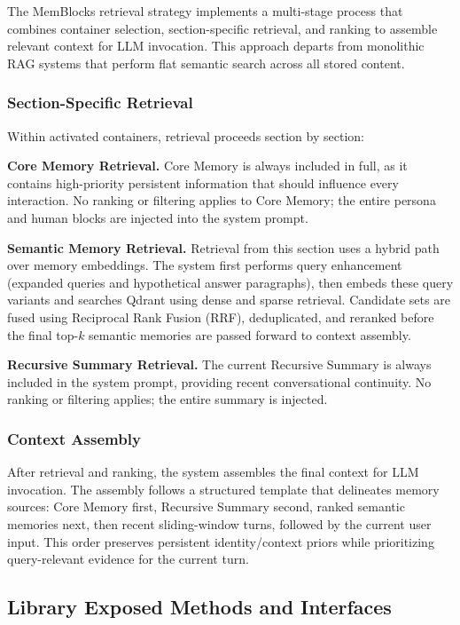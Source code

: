 \documentclass[12pt,a4paper]{article}
\begin{document}
The MemBlocks retrieval strategy implements a multi-stage process that combines container selection, section-specific retrieval, and ranking to assemble relevant context for LLM invocation. This approach departs from monolithic RAG systems that perform flat semantic search across all stored content.

\subsubsection{Section-Specific Retrieval}

Within activated containers, retrieval proceeds section by section:

\textbf{Core Memory Retrieval.} Core Memory is always included in full, as it contains high-priority persistent information that should influence every interaction. No ranking or filtering applies to Core Memory; the entire persona and human blocks are injected into the system prompt.

\textbf{Semantic Memory Retrieval.} Retrieval from this section uses a hybrid path over memory embeddings. The system first performs query enhancement (expanded queries and hypothetical answer paragraphs), then embeds these query variants and searches Qdrant using dense and sparse retrieval. Candidate sets are fused using Reciprocal Rank Fusion (RRF), deduplicated, and reranked before the final top-$k$ semantic memories are passed forward to context assembly.

\textbf{Recursive Summary Retrieval.} The current Recursive Summary is always included in the system prompt, providing recent conversational continuity. No ranking or filtering applies; the entire summary is injected.


\subsubsection{Context Assembly}

After retrieval and ranking, the system assembles the final context for LLM invocation. The assembly follows a structured template that delineates memory sources: Core Memory first, Recursive Summary second, ranked semantic memories next, then recent sliding-window turns, followed by the current user input. This order preserves persistent identity/context priors while prioritizing query-relevant evidence for the current turn.

\subsection{Library Exposed Methods and Interfaces}
\end{document}
